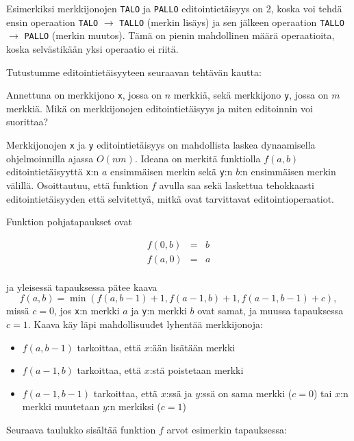 Esimerkiksi merkkijonojen \texttt{TALO} ja \texttt{PALLO}
editointietäisyys on 2, koska voi tehdä ensin
operaation \texttt{TALO} $\rightarrow$ \texttt{TALLO}
(merkin lisäys) ja sen jälkeen operaation
\texttt{TALLO} $\rightarrow$ \texttt{PALLO}
(merkin muutos).
Tämä on pienin mahdollinen määrä operaatioita, koska
selvästikään yksi operaatio ei riitä.

Tutustumme editointietäisyyteen seuraavan tehtävän kautta:
\begin{task}
Annettuna on merkkijono \texttt{x},
jossa on $n$ merkkiä,
sekä merkkijono \texttt{y},
jossa on $m$ merkkiä.
Mikä on merkkijonojen editointietäisyys ja
miten editoinnin voi suorittaa?
\end{task}

Merkkijonojen \texttt{x} ja \texttt{y}
editointietäisyys on mahdollista
laskea dynaamisella ohjelmoinnilla ajassa $O(nm)$.
Ideana on merkitä funktiolla $f(a,b)$
editointietäisyyttä \texttt{x}:n $a$
ensimmäisen merkin sekä
\texttt{y}:n $b$:n ensimmäisen merkin välillä.
Osoittautuu, että funktion $f$ avulla saa sekä
laskettua tehokkaasti editointietäisyyden että
selvitettyä, mitkä ovat tarvittavat editointioperaatiot.

Funktion pohjatapaukset ovat

\[
\begin{array}{lcl}
f(0,b) & = & b \\
f(a,0) & = & a \\
\end{array}
\]

\noindent
ja yleisessä tapauksessa pätee kaava
\[ f(a,b) = \min(f(a,b-1)+1,f(a-1,b)+1,f(a-1,b-1)+c),\]
missä $c=0$, jos \texttt{x}:n merkki $a$
ja \texttt{y}:n merkki $b$ ovat samat,
ja muussa tapauksessa $c=1$.
Kaava käy läpi mahdollisuudet lyhentää merkkijonoja:

\begin{itemize}
\item $f(a,b-1)$ tarkoittaa, että $x$:ään lisätään merkki
\item $f(a-1,b)$ tarkoittaa, että $x$:stä poistetaan merkki
\item $f(a-1,b-1)$ tarkoittaa, että $x$:ssä ja $y$:ssä on
sama merkki ($c=0$) tai $x$:n merkki muutetaan $y$:n merkiksi ($c=1$)
\end{itemize}

\noindent
Seuraava taulukko sisältää funktion $f$ arvot
esimerkin tapauksessa:

